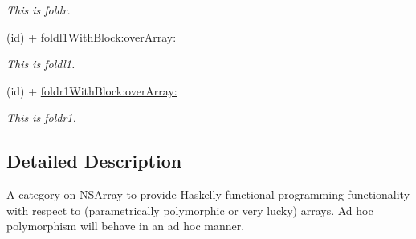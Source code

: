 \begin{DoxyCompactItemize}
\begin{DoxyCompactList}\small\item\em This is foldr. \end{DoxyCompactList}\item 
\hypertarget{interface_n_s_array_07_generics_08_a9dde9ff805c1b96b3a188685b186d76a}{(id) + \hyperlink{interface_n_s_array_07_generics_08_a9dde9ff805c1b96b3a188685b186d76a}{foldl1\-With\-Block\-:over\-Array\-:}}\label{interface_n_s_array_07_generics_08_a9dde9ff805c1b96b3a188685b186d76a}

\begin{DoxyCompactList}\small\item\em This is foldl1. \end{DoxyCompactList}\item 
\hypertarget{interface_n_s_array_07_generics_08_a0667bd2c27887837831f0216a099b27f}{(id) + \hyperlink{interface_n_s_array_07_generics_08_a0667bd2c27887837831f0216a099b27f}{foldr1\-With\-Block\-:over\-Array\-:}}\label{interface_n_s_array_07_generics_08_a0667bd2c27887837831f0216a099b27f}

\begin{DoxyCompactList}\small\item\em This is foldr1. \end{DoxyCompactList}\end{DoxyCompactItemize}


\subsection{Detailed Description}
A category on N\-S\-Array to provide Haskelly functional programming functionality with respect to (parametrically polymorphic or very lucky) arrays. Ad hoc polymorphism will behave in an ad hoc manner. 

